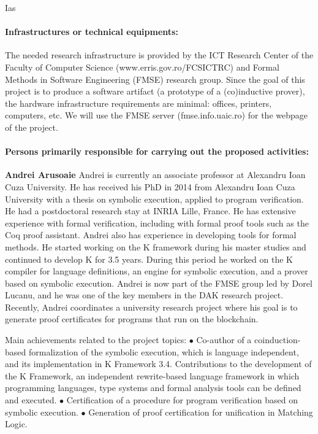 \begin{sitedescription}{Ias}
\paragraph*{Infrastructures or technical equipments:}

The needed research infrastructure is provided by the ICT Research Center of the Faculty of Computer Science (www.erris.gov.ro/FCSICTRC) and Formal Methods in Software Engineering (FMSE) research group. Since the goal of this project is to produce a software artifact (a prototype of a (co)inductive prover), the hardware infrastructure requirements are minimal: offices, printers, computers, etc. We will use the FMSE server (fmse.info.uaic.ro) for the webpage of the project. 

\paragraph*{Persons primarily responsible for carrying out the proposed activities:}

\begin{compactitem} %
\item{\bf Andrei Arusoaie}
Andrei is currently an associate professor at Alexandru Ioan Cuza University. He has received his PhD in 2014 from Alexandru Ioan Cuza University with a thesis on symbolic execution, applied to program verification. He had a postdoctoral research stay at INRIA Lille, France. He has extensive experience with formal verification, including with formal proof tools such as the Coq proof assistant. Andrei also has experience in developing tools for formal methods. He started working on the K framework during his master studies and continued to develop K for 3.5 years. During this period he worked on the K compiler for language definitions, an engine for symbolic execution, and a prover based on symbolic execution. 
Andrei is now part of the FMSE group led by Dorel Lucanu, and he was one of the key members in the DAK research project. Recently, Andrei coordinates a university  research project where his goal is to generate proof certificates for programs that run on the blockchain.

Main achievements related to the project topics:
$\bullet$ Co-author of a coinduction-based formalization of the symbolic execution, which is language independent, and its implementation in K Framework 3.4.
Contributions to the development of the K Framework, an independent rewrite-based language framework in which programming languages, type systems and formal analysis tools can be defined and executed.
$\bullet$ Certification of a procedure for program verification based on symbolic execution.
$\bullet$ Generation of proof certification for unification in Matching Logic.


\end{compactitem}
\end{sitedescription}
